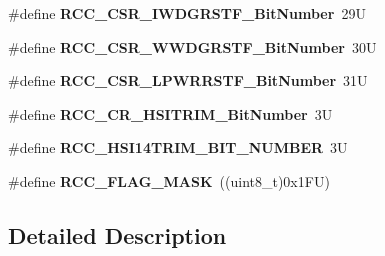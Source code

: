 \begin{DoxyCompactItemize}
\mbox{\label{group___r_c_c___private___constants_gaf50a9750abd8fe70afc87a24dd13b548}} 
\#define {\bfseries R\+C\+C\+\_\+\+C\+S\+R\+\_\+\+I\+W\+D\+G\+R\+S\+T\+F\+\_\+\+Bit\+Number}~29U
\item 
\mbox{\label{group___r_c_c___private___constants_gad9da4897bbc5cce84a887b8ae6273740}} 
\#define {\bfseries R\+C\+C\+\_\+\+C\+S\+R\+\_\+\+W\+W\+D\+G\+R\+S\+T\+F\+\_\+\+Bit\+Number}~30U
\item 
\mbox{\label{group___r_c_c___private___constants_ga94774bfc892c200d0030acb9997bd34a}} 
\#define {\bfseries R\+C\+C\+\_\+\+C\+S\+R\+\_\+\+L\+P\+W\+R\+R\+S\+T\+F\+\_\+\+Bit\+Number}~31U
\item 
\mbox{\label{group___r_c_c___private___constants_ga232d85b975206babbd3b8b46ea032fe3}} 
\#define {\bfseries R\+C\+C\+\_\+\+C\+R\+\_\+\+H\+S\+I\+T\+R\+I\+M\+\_\+\+Bit\+Number}~3U
\item 
\mbox{\label{group___r_c_c___private___constants_ga7ea919938864083978f5e25891622ef1}} 
\#define {\bfseries R\+C\+C\+\_\+\+H\+S\+I14\+T\+R\+I\+M\+\_\+\+B\+I\+T\+\_\+\+N\+U\+M\+B\+ER}~3U
\item 
\mbox{\label{group___r_c_c___private___constants_ga80017c6bf8a5c6f53a1a21bb8db93a82}} 
\#define {\bfseries R\+C\+C\+\_\+\+F\+L\+A\+G\+\_\+\+M\+A\+SK}~((uint8\+\_\+t)0x1\+F\+U)
\end{DoxyCompactItemize}


\subsection{Detailed Description}
